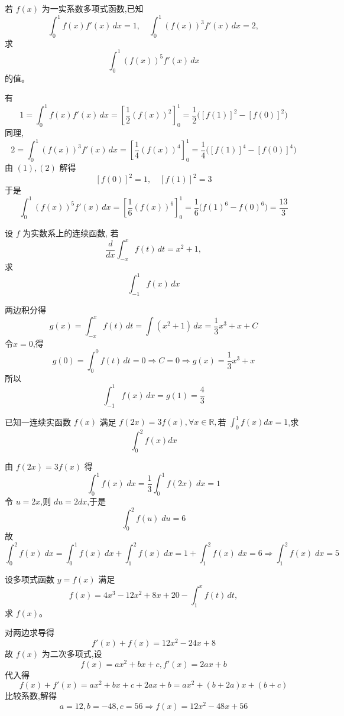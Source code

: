 \begin{questions}
    \question 若 $f(x)$ 为一实系数多项式函数,已知
    \[
    \int_{0}^{1} f(x) f'(x) \, dx = 1, \quad \int_{0}^{1} (f(x))^3 f'(x) \, dx = 2,
    \]
    求
    \[
    \int_{0}^{1} (f(x))^5 f'(x) \, dx
    \] 
    的值。
    \begin{solution}
        有
        \[
        1=\int_0^1 f(x) f'(x) \, dx = \left[ \frac{1}{2} (f(x))^2 \right]_0^1 = \frac{1}{2} \big([f(1)]^2 - [f(0)]^2\big) \tag{1}
        \]
        同理,
        \[
        2=\int_0^1 (f(x))^3 f'(x) \, dx = \left[ \frac{1}{4} (f(x))^4 \right]_0^1 = \frac{1}{4} \big([f(1)]^4 - [f(0)]^4\big) \tag{2}
        \]
        由 $(1),(2)$ 解得
        \[
        [f(0)]^2 = 1,\quad [f(1)]^2 = 3
        \]
        于是
        \[
        \int_0^1 (f(x))^5 f'(x) \, dx = \left[ \frac{1}{6} (f(x))^6 \right]_0^1 = \frac{1}{6} \big(f(1)^6 - f(0)^6\big) = \frac{13}{3}
        \]
    \end{solution}

    \question 设 $f$ 为实数系上的连续函数, 若
    \[
    \frac{d}{dx}\int_{-x}^{x}f(t)\,dt=x^{2}+1,
    \] 
    求 
    \[
    \int_{-1}^{1}f(x)\,dx
    \]
    \begin{solution}
        两边积分得
        \[
        g(x)=\int_{-x}^x f(t)\,dt =\int (x^2+1)\,dx =\frac{1}{3}x^3+x+ C
        \]
        令$x=0$,得
        \[
        g(0)= \int_0^0 f(t)\,dt= 0 \Rightarrow C=0 \Rightarrow g(x) =\frac{1}{3}x^3+x
        \]
        所以
        \[
        \int_{-1}^1 f(x)\,dx =g(1)=\frac{4}{3}
        \]
    \end{solution}

    \question 已知一连续实函数 $f(x)$ 满足 $f(2x)=3f(x),\forall x \in \mathbb{R},$若 $\displaystyle\int_{0}^{1} f(x) dx=1$,求 
    \[
    \int_{0}^{2} f(x) dx
    \]
    \begin{solution}
        由 $f(2x)=3f(x)$ 得
        \[
        \int_0^1 f(x)\;dx = \frac{1}{3} \int_0^1 f(2x)\;dx =1
        \]
        令 $u=2x$,则 $du=2dx$,于是
        \[
        \int_0^2 f(u)\;du =6
        \]
        故
        \[
        \int_0^2 f(x)\;dx = \int_0^1 f(x)\;dx + \int_1^2 f(x)\;dx =1 + \int_1^2 f(x)\;dx= 6 \Rightarrow \int_1^2 f(x)\;dx =5
        \]
    \end{solution}

    \question 设多项式函数 $y=f(x)$ 满足
    \[
    f(x) = 4x^3 - 12x^2 + 8x + 20 - \int_1^x f(t) \, dt,
    \]
    求 $f(x)$。
    \begin{solution}
        对两边求导得
        \[
        f'(x) + f(x) = 12x^2 - 24x + 8
        \]
        故 $f(x)$ 为二次多项式,设
        \[
        f(x) = a x^2 + b x + c,f'(x) = 2 a x + b
        \]
        代入得
        \[
        f(x) + f'(x) = a x^2 + b x + c + 2 a x + b = a x^2 + (b + 2 a) x + (b + c)
        \]
        比较系数,解得
        \[
        a = 12,  b = -48,  c = 56 \Rightarrow f(x) = 12 x^2 - 48 x + 56
        \]
    \end{solution}


\end{questions}
